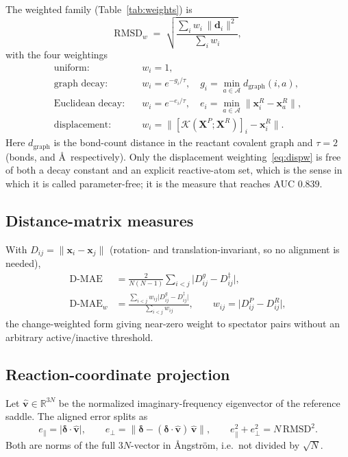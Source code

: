 \documentclass[11pt]{article}
\begin{document}
The weighted family (Table~\ref{tab:weights}) is
\begin{equation}
\text{RMSD}_{w} \;=\;
\sqrt{\frac{\sum_i w_i\,\lVert\mathbf{d}_i\rVert^{2}}{\sum_i w_i}},
\label{eq:wrmsd}
\end{equation}
with the four weightings
\begin{align}
\text{uniform:}&\quad w_i = 1, \\
\text{graph decay:}&\quad w_i = e^{-g_i/\tau}, \quad
 g_i = \min_{a\in\mathcal{A}} d_{\mathrm{graph}}(i,a), \\
\text{Euclidean decay:}&\quad w_i = e^{-e_i/\tau}, \quad
 e_i = \min_{a\in\mathcal{A}} \lVert\mathbf{x}^{R}_i-\mathbf{x}^{R}_a\rVert, \\
\text{displacement:}&\quad w_i = \bigl\lVert
 [\mathcal{K}(\mathbf{X}^{P};\mathbf{X}^{R})]_i-\mathbf{x}^{R}_i \bigr\rVert .
\label{eq:dispw}
\end{align}
Here $d_{\mathrm{graph}}$ is the bond-count distance in the reactant covalent
graph and $\tau=2$ (bonds, and \AA\ respectively). Only the displacement
weighting~\eqref{eq:dispw} is free of both a decay constant and an explicit
reactive-atom set, which is the sense in which it is called parameter-free; it is
the measure that reaches AUC $0.839$.

\subsection{Distance-matrix measures}
With $D_{ij}=\lVert\mathbf{x}_i-\mathbf{x}_j\rVert$ (rotation- and
translation-invariant, so no alignment is needed),
\begin{align}
\text{D-MAE} &= \frac{2}{N(N-1)}\sum_{i<j}
 \bigl\lvert D^{g}_{ij}-D^{\ddagger}_{ij}\bigr\rvert, \\
\text{D-MAE}_{w} &= \frac{\sum_{i<j} w_{ij}\bigl\lvert D^{g}_{ij}-D^{\ddagger}_{ij}\bigr\rvert}
 {\sum_{i<j} w_{ij}},
 \qquad w_{ij} = \bigl\lvert D^{P}_{ij}-D^{R}_{ij}\bigr\rvert ,
\end{align}
the change-weighted form giving near-zero weight to spectator pairs without an
arbitrary active/inactive threshold.

\subsection{Reaction-coordinate projection}
Let $\hat{\mathbf{v}}\in\mathbb{R}^{3N}$ be the normalized imaginary-frequency
eigenvector of the reference saddle. The aligned error splits as
\begin{equation}
e_{\parallel} = \bigl\lvert \boldsymbol{\delta}\cdot\hat{\mathbf{v}}\bigr\rvert,
\qquad
e_{\perp} = \bigl\lVert \boldsymbol{\delta}-(\boldsymbol{\delta}\cdot
\hat{\mathbf{v}})\,\hat{\mathbf{v}}\bigr\rVert,
\qquad
e_{\parallel}^{2}+e_{\perp}^{2} = N\,\text{RMSD}^{2} .
\end{equation}
Both are norms of the full $3N$-vector in \AA ngstr\"om, i.e.\ not divided by
$\sqrt{N}$.
\end{document}
